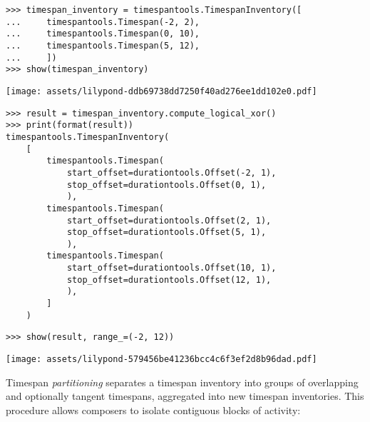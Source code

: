 \begin{singlespacing}
\vspace{-0.5\baselineskip}
\begin{lstlisting}
>>> timespan_inventory = timespantools.TimespanInventory([
...     timespantools.Timespan(-2, 2),
...     timespantools.Timespan(0, 10),
...     timespantools.Timespan(5, 12),
...     ])
>>> show(timespan_inventory)
\end{lstlisting}
\noindent\texttt{[image: assets/lilypond-ddb69738dd7250f40ad276ee1dd102e0.pdf]}
\begin{lstlisting}
>>> result = timespan_inventory.compute_logical_xor()
>>> print(format(result))
timespantools.TimespanInventory(
    [
        timespantools.Timespan(
            start_offset=durationtools.Offset(-2, 1),
            stop_offset=durationtools.Offset(0, 1),
            ),
        timespantools.Timespan(
            start_offset=durationtools.Offset(2, 1),
            stop_offset=durationtools.Offset(5, 1),
            ),
        timespantools.Timespan(
            start_offset=durationtools.Offset(10, 1),
            stop_offset=durationtools.Offset(12, 1),
            ),
        ]
    )
\end{lstlisting}
\begin{lstlisting}
>>> show(result, range_=(-2, 12))
\end{lstlisting}
\noindent\texttt{[image: assets/lilypond-579456be41236bcc4c6f3ef2d8b96dad.pdf]}
\end{singlespacing}

\noindent Timespan \emph{partitioning} separates a timespan inventory into
groups of overlapping and optionally tangent timespans, aggregated into new
timespan inventories. This procedure allows composers to isolate contiguous
blocks of activity:

\begin{comment}
<abjad>
timespan_inventory = timespantools.TimespanInventory([
    timespantools.Timespan(0, 10),
    timespantools.Timespan(5, 15),
    timespantools.Timespan(15, 20),
    timespantools.Timespan(25, 30),
    ])
show(timespan_inventory)
for shard in timespan_inventory.partition():
    show(shard, range_=(0, 30))

for shard in timespan_inventory.partition(include_tangent_timespans=True):
    show(shard, range_=(0, 30))

</abjad>
\end{comment}

